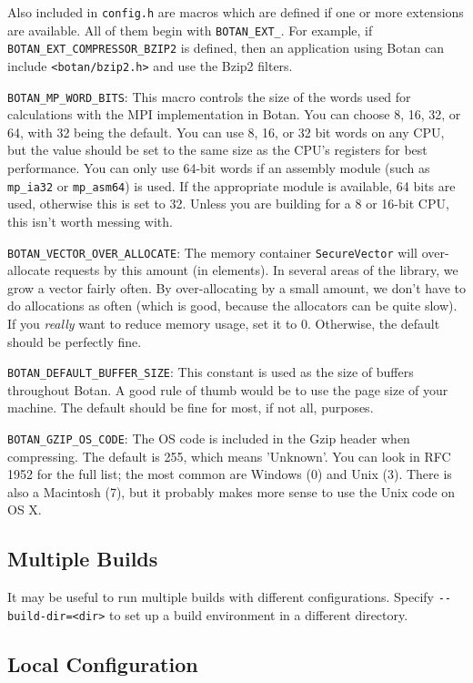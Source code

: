 \documentclass{article}
\newcommand{\filename}[1]{\texttt{#1}}
\newcommand{\module}[1]{\texttt{#1}}
\newcommand{\type}[1]{\texttt{#1}}
\newcommand{\macro}[1]{\texttt{#1}}
\begin{document}
Also included in \filename{config.h} are macros which are defined if one or
more extensions are available. All of them begin with \verb|BOTAN_EXT_|. For
example, if \verb|BOTAN_EXT_COMPRESSOR_BZIP2| is defined, then an application
using Botan can include \filename{<botan/bzip2.h>} and use the Bzip2 filters.

\macro{BOTAN\_MP\_WORD\_BITS}: This macro controls the size of the
words used for calculations with the MPI implementation in Botan. You
can choose 8, 16, 32, or 64, with 32 being the default. You can use 8,
16, or 32 bit words on any CPU, but the value should be set to the
same size as the CPU's registers for best performance. You can only
use 64-bit words if an assembly module (such as \module{mp\_ia32} or
\module{mp\_asm64}) is used. If the appropriate module is available,
64 bits are used, otherwise this is set to 32. Unless you are building
for a 8 or 16-bit CPU, this isn't worth messing with.

\macro{BOTAN\_VECTOR\_OVER\_ALLOCATE}: The memory container
\type{SecureVector} will over-allocate requests by this amount (in
elements). In several areas of the library, we grow a vector fairly often. By
over-allocating by a small amount, we don't have to do allocations as often
(which is good, because the allocators can be quite slow). If you \emph{really}
want to reduce memory usage, set it to 0. Otherwise, the default should be
perfectly fine.

\macro{BOTAN\_DEFAULT\_BUFFER\_SIZE}: This constant is used as the size of
buffers throughout Botan. A good rule of thumb would be to use the page size of
your machine. The default should be fine for most, if not all, purposes.

\macro{BOTAN\_GZIP\_OS\_CODE}: The OS code is included in the Gzip header when
compressing. The default is 255, which means 'Unknown'. You can look in RFC
1952 for the full list; the most common are Windows (0) and Unix (3). There is
also a Macintosh (7), but it probably makes more sense to use the Unix code on
OS X.

\subsection{Multiple Builds}

It may be useful to run multiple builds with different
configurations. Specify \verb|--build-dir=<dir>| to set up a build
environment in a different directory.

\subsection{Local Configuration}
\end{document}
